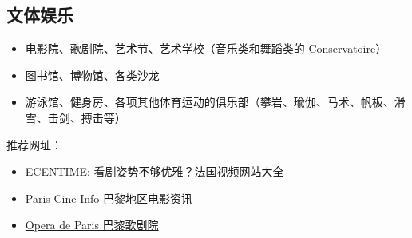 \subsection{文体娱乐}
\begin{itemize}
    \item 电影院、歌剧院、艺术节、艺术学校（音乐类和舞蹈类的 Conservatoire）
    \item 图书馆、博物馆、各类沙龙
    \item 游泳馆、健身房、各项其他体育运动的俱乐部（攀岩、瑜伽、马术、帆板、滑雪、击剑、搏击等）
\end{itemize}

推荐网址：
\begin{itemize}
    \item \href{https://www.ecentime.com/article/streaming-website }{ECENTIME: 看剧姿势不够优雅？法国视频网站大全}
    \item \href{https://paris-cine.info/}{Paris Cine Info 巴黎地区电影资讯}
    \item \href{https://www.operadeparis.fr/en}{Opera de Paris 巴黎歌剧院}
\end{itemize}
